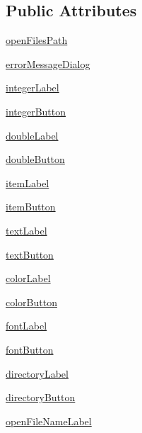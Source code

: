\subsection*{Public Attributes}
\begin{DoxyCompactItemize}
\item 
\hyperlink{classstandarddialogs_1_1Dialog_a86f28d3e79af4aca185f4fae48a43cfd}{open\+Files\+Path}
\item 
\hyperlink{classstandarddialogs_1_1Dialog_a524d23181ea24ab2b07f9e3d423046f2}{error\+Message\+Dialog}
\item 
\hyperlink{classstandarddialogs_1_1Dialog_af91cc439c1d52e383ba38c832b947066}{integer\+Label}
\item 
\hyperlink{classstandarddialogs_1_1Dialog_a521983690553020088c687f1ff32140a}{integer\+Button}
\item 
\hyperlink{classstandarddialogs_1_1Dialog_afc0ade0bdbe86d26781d60e4a086843e}{double\+Label}
\item 
\hyperlink{classstandarddialogs_1_1Dialog_a80927ab3c8e036ce19eed84e07d1f5e9}{double\+Button}
\item 
\hyperlink{classstandarddialogs_1_1Dialog_a18554c9097c125d18882af1e9c6d2988}{item\+Label}
\item 
\hyperlink{classstandarddialogs_1_1Dialog_a348d2724279cccd34049f25e14ca28e9}{item\+Button}
\item 
\hyperlink{classstandarddialogs_1_1Dialog_ae0ce9066c4de0fd6fb6b29b8a350a7e7}{text\+Label}
\item 
\hyperlink{classstandarddialogs_1_1Dialog_a20b3850b88823848f27940810c634bda}{text\+Button}
\item 
\hyperlink{classstandarddialogs_1_1Dialog_ae6aaaabfe0229a2465f36200c5b32f88}{color\+Label}
\item 
\hyperlink{classstandarddialogs_1_1Dialog_a63c6997f7e970484fb01378e9b40b6e1}{color\+Button}
\item 
\hyperlink{classstandarddialogs_1_1Dialog_a171d5d2cf19fd744c6f30195d939f5d2}{font\+Label}
\item 
\hyperlink{classstandarddialogs_1_1Dialog_a32fefedd33447fd331162c9c29d9eb18}{font\+Button}
\item 
\hyperlink{classstandarddialogs_1_1Dialog_a2facabbb9db41267392f237f68f81966}{directory\+Label}
\item 
\hyperlink{classstandarddialogs_1_1Dialog_aaba4e4bad686ef23591f51912f931063}{directory\+Button}
\item 
\hyperlink{classstandarddialogs_1_1Dialog_aa989dd4ca641ea747d49af0b9ccb9e1b}{open\+File\+Name\+Label}

\end{DoxyCompactItemize}
